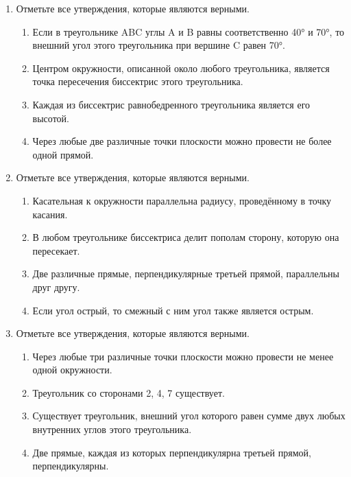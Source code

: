 \documentclass[a4paper,12pt]{article}
\newcommand{\taskspace}{\par\vspace{0.42cm}}
\begin{document}
\begin{enumerate}[resume]
\taskspace

\item Отметьте все утверждения, которые являются верными.
\begin{enumerate}[label=\arabic*),leftmargin=8mm,itemsep=0.25em,topsep=0.35em]
\item Если в треугольнике ABC углы A и B равны соответственно 40° и 70°, то внешний угол этого треугольника при вершине C равен 70°.
\item Центром окружности, описанной около любого треугольника, является точка пересечения биссектрис этого треугольника.
\item Каждая из биссектрис равнобедренного треугольника является его высотой.
\item Через любые две различные точки плоскости можно провести не более одной прямой.
\end{enumerate}

\taskspace

\item Отметьте все утверждения, которые являются верными.
\begin{enumerate}[label=\arabic*),leftmargin=8mm,itemsep=0.25em,topsep=0.35em]
\item Касательная к окружности параллельна радиусу, проведённому в точку касания.
\item В любом треугольнике биссектриса делит пополам сторону, которую она пересекает.
\item Две различные прямые, перпендикулярные третьей прямой, параллельны друг другу.
\item Если угол острый, то смежный с ним угол также является острым.
\end{enumerate}

\taskspace

\item Отметьте все утверждения, которые являются верными.
\begin{enumerate}[label=\arabic*),leftmargin=8mm,itemsep=0.25em,topsep=0.35em]
\item Через любые три различные точки плоскости можно провести не менее одной окружности.
\item Треугольник со сторонами 2, 4, 7 существует.
\item Существует треугольник, внешний угол которого равен сумме двух любых внутренних углов этого треугольника.
\item Две прямые, каждая из которых перпендикулярна третьей прямой, перпендикулярны.
\end{enumerate}


\end{enumerate}
\end{document}
